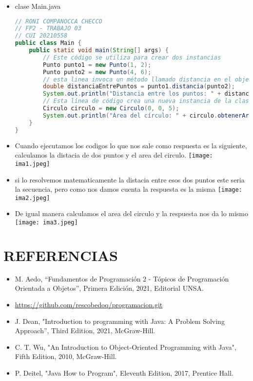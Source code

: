 \documentclass{article}
\begin{document}
\begin{itemize}
        \item clase Main.java
        \begin{lstlisting}[language=java]
// RONI COMPANOCCA CHECCO
// FP2 - TRABAJO 03
// CUI 20210558
public class Main {
    public static void main(String[] args) {
        // Este código se utiliza para crear dos instancias
        Punto punto1 = new Punto(1, 2);
        Punto punto2 = new Punto(4, 6);
        // esta linea invoca un método llamado distancia en el objeto punto1 de la clase Punto. 
        double distanciaEntrePuntos = punto1.distancia(punto2);
        System.out.println("Distancia entre los puntos: " + distanciaEntrePuntos);
        // Esta línea de código crea una nueva instancia de la clase Circulo 
        Circulo circulo = new Circulo(0, 0, 5);
        System.out.println("Área del círculo: " + circulo.obtenerArea());
    }
}
        \end{lstlisting}
        \item Cuando ejecutamos los codigos lo que nos sale como respuesta es la siguiente, calculamos la distacia de dos puntos y el area del circulo.
        \centering
        \texttt{[image: ima1.jpeg]}
        \item si lo resolvemos matematicamente la distacia entre esos dos puntos este seria la secuencia, pero como nos damos cuenta la respuesta es la misma
        \texttt{[image: ima2.jpeg]}
        \item De igual manera calculamos el area del circulo y la respuesta nos da lo mismo
        \texttt{[image: ima3.jpeg]}
        
	\end{itemize}

	\section{REFERENCIAS}
	\begin{itemize}
		\item M. Aedo, “Fundamentos de Programación 2 - Tópicos de Programación Orientada a Objetos”, Primera Edición, 2021, Editorial UNSA.
		\item \url{https://github.com/rescobedoq/programacion.git}
		\item J. Dean, "Introduction to programming with Java: A Problem Solving Approach”, Third Edition, 2021, McGraw-Hill.
        \item C. T. Wu, "An Introduction to Object-Oriented Programming with Java", Fifth Edition, 2010, McGraw-Hill.
        \item P. Deitel, "Java How to Program", Eleventh Edition, 2017, Prentice Hall.
	\end{itemize}
	
%
%
%
			
\end{document}

